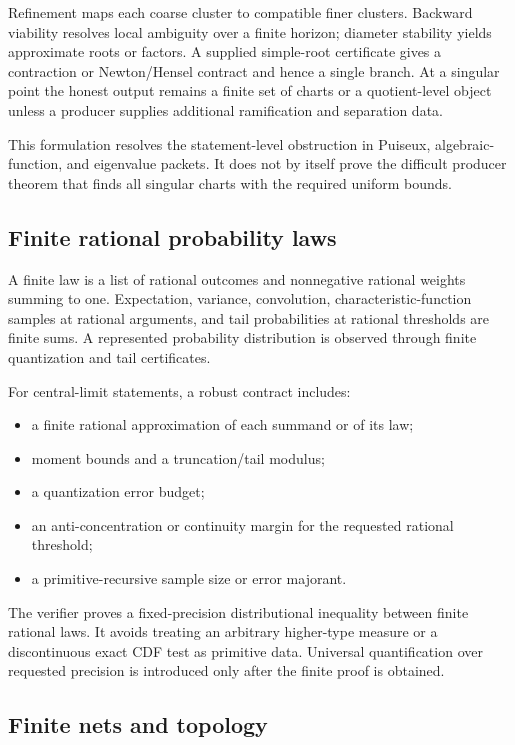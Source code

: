 Refinement maps each coarse cluster to compatible finer clusters.  Backward viability resolves local ambiguity over a finite horizon; diameter stability yields approximate roots or factors.  A supplied simple-root certificate gives a contraction or Newton/Hensel contract and hence a single branch.  At a singular point the honest output remains a finite set of charts or a quotient-level object unless a producer supplies additional ramification and separation data.

This formulation resolves the statement-level obstruction in Puiseux, algebraic-function, and eigenvalue packets.  It does not by itself prove the difficult producer theorem that finds all singular charts with the required uniform bounds.

\subsection{Finite rational probability laws}

A finite law is a list of rational outcomes and nonnegative rational weights summing to one.  Expectation, variance, convolution, characteristic-function samples at rational arguments, and tail probabilities at rational thresholds are finite sums.  A represented probability distribution is observed through finite quantization and tail certificates.

For central-limit statements, a robust contract includes:

\begin{itemize}
  \item a finite rational approximation of each summand or of its law;
  \item moment bounds and a truncation/tail modulus;
  \item a quantization error budget;
  \item an anti-concentration or continuity margin for the requested rational threshold;
  \item a primitive-recursive sample size or error majorant.
\end{itemize}

The verifier proves a fixed-precision distributional inequality between finite rational laws.  It avoids treating an arbitrary higher-type measure or a discontinuous exact CDF test as primitive data.  Universal quantification over requested precision is introduced only after the finite proof is obtained.

\subsection{Finite nets and topology}

